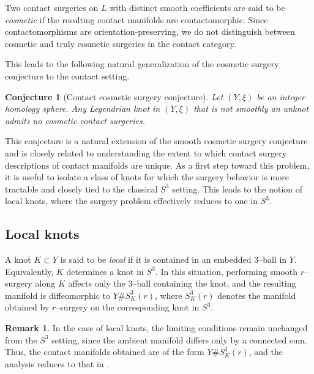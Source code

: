 \documentclass[12pt]{amsart}
\newtheorem{conjecture}[theorem]{Conjecture}
\theoremstyle{definition}
\newtheorem{remark} [theorem] {Remark}
\theoremstyle{definition}
\begin{document}
Two contact surgeries on $L$ with distinct smooth coefficients are said to be \textit{cosmetic} if the resulting contact manifolds are contactomorphic. Since contactomorphisms are orientation-preserving, we do not distinguish between cosmetic and truly cosmetic surgeries in the contact category.

This leads to the following natural generalization of the cosmetic surgery conjecture to the contact setting.

\begin{conjecture}[Contact cosmetic surgery conjecture]
Let $(Y,\xi)$ be an integer homology sphere. Any Legendrian knot in $(Y,\xi)$ that is not smoothly an unknot admits no cosmetic contact surgeries.
\end{conjecture}

This conjecture is a natural extension of the smooth cosmetic surgery conjecture and is closely related to understanding the extent to which contact surgery descriptions of contact manifolds are unique.
As a first step toward this problem, it is useful to isolate a class of knots for which the surgery behavior is more tractable and closely tied to the classical $S^3$ setting. This leads to the notion of local knots, where the surgery problem effectively reduces to one in $S^3$.
\subsection*{Local knots}

A knot $K \subset Y$ is said to be \emph{local} if it is contained
in an embedded $3$–ball in $Y$. Equivalently, $K$ determines
a knot in $S^3$. In this situation, performing smooth $r$–surgery
along $K$ affects only the $3$–ball containing the knot,
and the resulting manifold is diffeomorphic to
$Y \# S^3_K(r)$,
where $S^3_K(r)$ denotes the manifold obtained by $r$–surgery
on the corresponding knot in $S^3$. 

\begin{remark}
In the case of local knots, the limiting conditions
remain unchanged from the $S^3$ setting,
since the ambient manifold differs only by a
connected sum.
Thus, the contact manifolds obtained are of the form $Y \# S^3_K(r)$,
and the analysis reduces to that in
\cite{ES}.
\end{remark}
\end{document}

